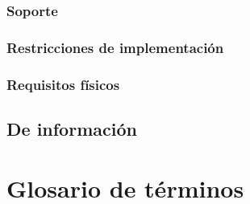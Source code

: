 \subsubsection{Soporte}


\subsubsection{Restricciones de implementación}

\subsubsection{Requisitos físicos}
\newpage

\subsection{De información}

\newpage

\section{Glosario de términos}

\newpage


